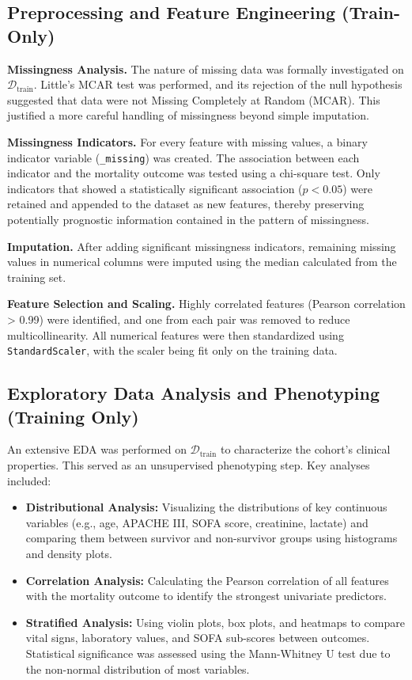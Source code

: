 \subsection{Preprocessing and Feature Engineering (Train-Only)}
\textbf{Missingness Analysis.} The nature of missing data was formally investigated on $\mathcal{D}_{\text{train}}$. Little's MCAR test was performed, and its rejection of the null hypothesis suggested that data were not Missing Completely at Random (MCAR). This justified a more careful handling of missingness beyond simple imputation.

\textbf{Missingness Indicators.} For every feature with missing values, a binary indicator variable (\texttt{\_missing}) was created. The association between each indicator and the mortality outcome was tested using a chi-square test. Only indicators that showed a statistically significant association ($p<0.05$) were retained and appended to the dataset as new features, thereby preserving potentially prognostic information contained in the pattern of missingness.

\textbf{Imputation.} After adding significant missingness indicators, remaining missing values in numerical columns were imputed using the median calculated from the training set.

\textbf{Feature Selection and Scaling.} Highly correlated features (Pearson correlation > 0.99) were identified, and one from each pair was removed to reduce multicollinearity. All numerical features were then standardized using \texttt{StandardScaler}, with the scaler being fit only on the training data.

\subsection{Exploratory Data Analysis and Phenotyping (Training Only)}
An extensive EDA was performed on $\mathcal{D}_{\text{train}}$ to characterize the cohort's clinical properties. This served as an unsupervised phenotyping step. Key analyses included:
\begin{itemize}
    \item \textbf{Distributional Analysis:} Visualizing the distributions of key continuous variables (e.g., age, APACHE III, SOFA score, creatinine, lactate) and comparing them between survivor and non-survivor groups using histograms and density plots.
    \item \textbf{Correlation Analysis:} Calculating the Pearson correlation of all features with the mortality outcome to identify the strongest univariate predictors.
    \item \textbf{Stratified Analysis:} Using violin plots, box plots, and heatmaps to compare vital signs, laboratory values, and SOFA sub-scores between outcomes. Statistical significance was assessed using the Mann-Whitney U test due to the non-normal distribution of most variables.
\end{itemize}

